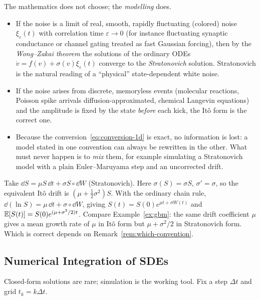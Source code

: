 \begin{remark}
\label{rem:which-convention}
The mathematics does not choose; the \emph{modelling} does.
\begin{itemize}
\item If the noise is a limit of real, smooth, rapidly fluctuating (colored) noise $\xi_\varepsilon(t)$ with correlation time $\varepsilon\to0$ (for instance fluctuating synaptic conductance or channel gating treated as fast Gaussian forcing), then by the \emph{Wong--Zakai theorem} the solutions of the ordinary ODEs $\dot v=f(v)+\sigma(v)\xi_\varepsilon(t)$ converge to the \emph{Stratonovich} solution. Stratonovich is the natural reading of a ``physical'' state-dependent white noise.
\item If the noise arises from discrete, memoryless events (molecular reactions, Poisson spike arrivals diffusion-approximated, chemical Langevin equations) and the amplitude is fixed by the state \emph{before} each kick, the It\^o form is the correct one.
\item Because the conversion~\eqref{eq:conversion-1d} is exact, no information is lost: a model stated in one convention can always be rewritten in the other. What must never happen is to \emph{mix} them, for example simulating a Stratonovich model with a plain Euler--Maruyama step and an uncorrected drift.
\end{itemize}
\end{remark}

\begin{example}
\label{ex:strat-gbm}
Take $\dd S=\mu S\,\dd t+\sigma S\circ\dd W$ (Stratonovich). Here $\sigma(S)=\sigma S$, $\sigma'=\sigma$, so the equivalent It\^o drift is $(\mu+\tfrac12\sigma^2)S$. With the ordinary chain rule, $\dd(\ln S)=\mu\,\dd t+\sigma\circ\dd W$, giving $S(t)=S(0)e^{\mu t+\sigma W(t)}$ and $\operatorname{\mathbb{E}}[S(t)]=S(0)e^{(\mu+\sigma^2/2)t}$. Compare Example~\ref{ex:gbm}: the same drift coefficient $\mu$ gives a mean growth rate of $\mu$ in It\^o form but $\mu+\sigma^2/2$ in Stratonovich form. Which is correct depends on Remark~\ref{rem:which-convention}.
\end{example}

\subsection{Numerical Integration of SDEs}
\label{sec:numerical-sde}

Closed-form solutions are rare; simulation is the working tool. Fix a step $\Delta t$ and grid $t_k=k\Delta t$.

